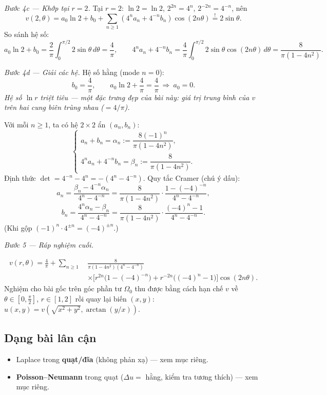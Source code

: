 \emph{Bước 4c --- Khớp tại $r=2$.} Tại $r=2$: $\ln 2=\ln 2$, $2^{2n}=4^n$, $2^{-2n}=4^{-n}$, nên
\[
  v(2,\theta)=a_0\ln2+b_0+\sum_{n\ge1}(4^n a_n+4^{-n}b_n)\cos(2n\theta)\overset{!}{=}2\sin\theta.
\]
So sánh hệ số:
\[
  a_0\ln2+b_0=\frac{2}{\pi}\!\int_0^{\pi/2}\!2\sin\theta\,d\theta=\frac{4}{\pi},\qquad
  4^n a_n+4^{-n}b_n=\frac{4}{\pi}\!\int_0^{\pi/2}\!2\sin\theta\cos(2n\theta)\,d\theta=\frac{8}{\pi(1-4n^2)}.
\]

\emph{Bước 4d --- Giải các hệ.} Hệ số hằng (mode $n=0$):
\[
  b_0=\frac{4}{\pi},\qquad a_0\ln2+\frac{4}{\pi}=\frac{4}{\pi}\ \Longrightarrow\ a_0=0.
\]
\emph{Hệ số $\ln r$ triệt tiêu --- một đặc trưng đẹp của bài này: giá trị trung bình của $v$ trên hai cung biên trùng nhau ($=4/\pi$).}

Với mỗi $n\ge1$, ta có hệ $2\times2$ ẩn $(a_n,b_n)$:
\[
  \begin{cases}a_n+b_n=\alpha_n:=\dfrac{8(-1)^n}{\pi(1-4n^2)},\\[4pt] 4^n a_n+4^{-n}b_n=\beta_n:=\dfrac{8}{\pi(1-4n^2)}.\end{cases}
\]
Định thức $\det=4^{-n}-4^n=-(4^n-4^{-n})$. Quy tắc Cramer (chú ý dấu):
\[
  a_n=\frac{\beta_n-4^{-n}\alpha_n}{4^n-4^{-n}}
     =\frac{8}{\pi(1-4n^2)}\cdot\frac{1-(-4)^{-n}}{4^n-4^{-n}},
\]
\[
  b_n=\frac{4^n\alpha_n-\beta_n}{4^n-4^{-n}}
     =\frac{8}{\pi(1-4n^2)}\cdot\frac{(-4)^n-1}{4^n-4^{-n}}.
\]
(Khi gộp $(-1)^n\cdot 4^{\pm n}=(-4)^{\pm n}$.)

\emph{Bước 5 --- Ráp nghiệm cuối.}
\begin{nhobox}
\[
  \begin{aligned}
  v(r,\theta)=\frac{4}{\pi}+\sum_{n\ge1}\ &\frac{8}{\pi(1-4n^2)(4^n-4^{-n})}\\
  &\times\Big[r^{2n}\big(1-(-4)^{-n}\big)+r^{-2n}\big((-4)^n-1\big)\Big]\cos(2n\theta).
  \end{aligned}
\]
Nghiệm cho bài gốc trên góc phần tư $\Omega_0$ thu được bằng cách hạn chế $v$ về $\theta\in[0,\tfrac{\pi}{2}]$, $r\in[1,2]$ rồi quay lại biến $(x,y)$: $u(x,y)=v(\sqrt{x^2+y^2},\arctan(y/x))$.
\end{nhobox}

\subsection*{Dạng bài lân cận}
\begin{itemize}
  \item Laplace trong \textbf{quạt/đĩa} (không phản xạ) --- xem mục riêng.
  \item \textbf{Poisson--Neumann} trong quạt ($\Delta u=$ hằng, kiểm tra tương thích) --- xem mục riêng.
\end{itemize}
